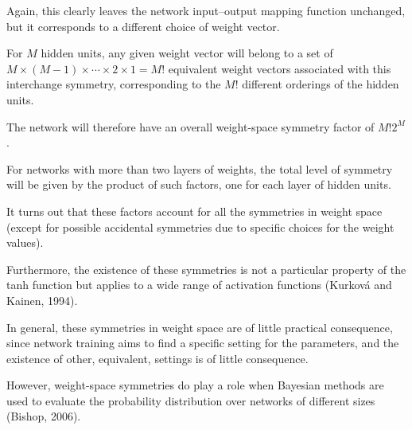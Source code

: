 \documentclass{article}
\begin{document}
Again, this clearly leaves the network input–output mapping function unchanged, but it corresponds to a different choice of weight vector. 

For $M$ hidden units, any given weight vector will belong to a set of $M \times (M-1) \times \cdots \times 2 \times 1 = M!$ equivalent weight vectors associated with this interchange symmetry, corresponding to the $M!$ different orderings of the hidden units. 

The network will therefore have an overall weight-space symmetry factor of $M! 2^M$. 

For networks with more than two layers of weights, the total level of symmetry will be given by the product of such factors, one for each layer of hidden units.

It turns out that these factors account for all the symmetries in weight space (except for possible accidental symmetries due to specific choices for the weight values). 

Furthermore, the existence of these symmetries is not a particular property of the tanh function but applies to a wide range of activation functions (Kurková and Kainen, 1994). 

In general, these symmetries in weight space are of little practical consequence, since network training aims to find a specific setting for the parameters, and the existence of other, equivalent, settings is of little consequence. 

However, weight-space symmetries do play a role when Bayesian methods are used to evaluate the probability distribution over networks of different sizes (Bishop, 2006).
\end{document}

